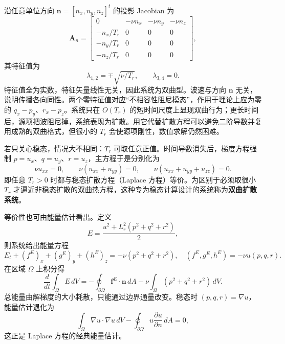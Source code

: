 \documentclass[11pt,a4paper,openany,fontset=none]{ctexbook}
\begin{document}
沿任意单位方向 $\bm n=[n_x,n_y,n_z]^t$ 的投影 Jacobian 为
\begin{equation}
 \bm A_n=
 \begin{bmatrix}
 0&-\nu n_x&-\nu n_y&-\nu n_z\\
 -n_x/T_r&0&0&0\\-n_y/T_r&0&0&0\\-n_z/T_r&0&0&0
 \end{bmatrix}, \tag{2.5.7}
\end{equation}
其特征值为
\begin{equation}
 \lambda_{1,2}=\mp\sqrt{\nu/T_r},\qquad \lambda_{3,4}=0. \tag{2.5.8}
\end{equation}
特征值全为实数，特征矢量线性无关，因此系统为双曲型。波速与方向 $\bm n$ 无关，说明传播各向同性。两个零特征值对应“不相容性阻尼模态”，作用于理论上应为零的 $q_x-p_y$、$r_x-p_z$。系统只在 $O(T_r)$ 的短时间尺度上显现双曲行为；更长时间后，源项把波阻尼掉，系统表现为扩散。用它代替扩散方程可以避免二阶导数并复用成熟的双曲格式，但很小的 $T_r$ 会使源项刚性，数值求解仍然困难。

若只关心稳态，情况大不相同：$T_r$ 可取任意正值。时间导数消失后，梯度方程强制 $p=u_x$、$q=u_y$、$r=u_z$，主方程于是分别化为
\begin{equation}
 \nu u_{xx}=0,\qquad \nu(u_{xx}+u_{yy})=0,\qquad
 \nu(u_{xx}+u_{yy}+u_{zz})=0. \tag{2.5.9--11}
\end{equation}
即任意 $T_r>0$ 时都与稳态扩散方程（Laplace 方程）等价。为区别于必须取很小 $T_r$ 才逼近非稳态扩散的双曲热方程，这种专为稳态计算设计的系统称为\textbf{双曲扩散系统}。

等价性也可由能量估计看出。定义
\begin{equation}
 E=\frac{u^2+L_r^2(p^2+q^2+r^2)}{2}, \tag{2.5.12}
\end{equation}
则系统给出能量方程
\begin{equation}
 E_t+(f^E)_x+(g^E)_y+(h^E)_z=-\nu(p^2+q^2+r^2),
 \quad (f^E,g^E,h^E)=-\nu u(p,q,r). \tag{2.5.13--14}
\end{equation}
在区域 $\Omega$ 上积分得
\begin{equation}
 \frac{d}{dt}\int_\Omega E\,dV=-\oint_{\partial\Omega}\bm f^E\cdot\bm n\,dA
 -\nu\int_\Omega(p^2+q^2+r^2)\,dV. \tag{2.5.15}
\end{equation}
总能量由解梯度的大小耗散，只能通过边界通量改变。稳态时 $(p,q,r)=\nabla u$，能量估计退化为
\begin{equation}
 \int_\Omega\nabla u\cdot\nabla u\,dV-
 \oint_{\partial\Omega}u\frac{\partial u}{\partial n}\,dA=0, \tag{2.5.16}
\end{equation}
这正是 Laplace 方程的经典能量估计。
\end{document}
